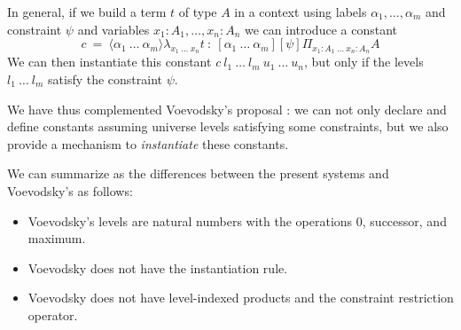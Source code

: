 \documentclass[11pt,a4paper]{article}
\theoremstyle{definition}
\newcommand{\lam}[1]{{\langle}#1{\rangle}}
\newcommand{\Id}{\mathsf{Id}}
\newcommand{\UU}{\mathsf{U}}
\begin{document}
\medskip

In general, if we  build a term $t$ of type $A$ in a context using labels $\alpha_1,\dots,\alpha_m$
and constraint $\psi$ and variables $x_1:A_1,\dots,x_n:A_n$ we can introduce a constant
$$
c~=~ \lam{\alpha_1~\dots~\alpha_m}\lambda_{x_1~\dots~x_n}t ~:~
[\alpha_1~\dots~\alpha_m][\psi]\Pi_{x_1:A_1~\dots~x_n:A_n}A
$$
We can then instantiate this constant $c~l_1~\dots~l_m~u_1~\dots~u_n$, but only if the levels
$l_1~\dots~l_m$ satisfy the constraint $\psi$.

    We have thus complemented Voevodsky's proposal \cite{VV}: we can not only declare and define
    constants assuming universe levels satisfying some constraints, but we also provide a mechanism
    to {\em instantiate} these constants.

 We can summarize as the differences between the present systems and Voevodsky's as follows:
 \begin{itemize}
\item Voevodsky's levels are natural numbers with the operations $0$, successor, and maximum.
\item Voevodsky does not have the instantiation rule.
\item Voevodsky does not have level-indexed products and the constraint restriction operator.
\end{itemize}






\end{document}
